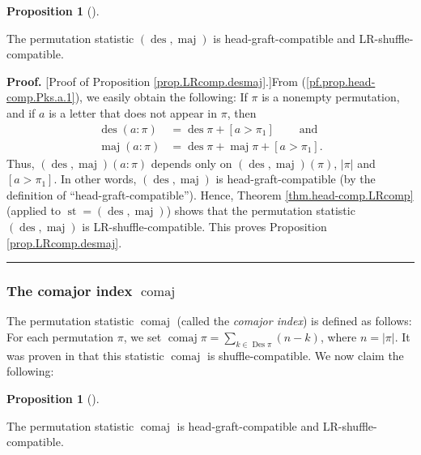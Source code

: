 \documentclass[numbers=enddot,12pt,final,onecolumn,notitlepage]{scrartcl}%
\theoremstyle{definition}
\newtheorem{prop}[theo]{Proposition}
\newenvironment{proposition}[1][]
{\begin{prop}[#1]\begin{leftbar}}
{\end{leftbar}\end{prop}}
\newenvironment{proof}[1][Proof]{\noindent\textbf{#1.} }{\ \rule{0.5em}{0.5em}}
\let\sumnonlimits\sum
\renewcommand{\sum}{\sumnonlimits\limits}
\begin{document}
\begin{proposition}
\label{prop.LRcomp.desmaj}The permutation statistic $\left(
\operatorname{des},\operatorname*{maj}\right)  $ is head-graft-compatible and LR-shuffle-compatible.
\end{proposition}

\begin{proof}
[Proof of Proposition \ref{prop.LRcomp.desmaj}.]From
(\ref{pf.prop.head-comp.Pks.a.1}), we easily obtain the following: If $\pi$ is
a nonempty permutation, and if $a$ is a letter that does not appear in $\pi$,
then%
\begin{align*}
\operatorname{des}\left(  a:\pi\right)
&  =\operatorname{des}\pi+\left[ a>\pi_{1}\right]
\ \ \ \ \ \ \ \ \ \ \text{and}\\
\operatorname{maj}\left(  a:\pi\right)
&  =\operatorname{des} \pi + \operatorname{maj}\pi +\left[  a>\pi_{1}\right]  .
\end{align*}
Thus, $\left(  \operatorname{des},\operatorname*{maj}\right)  \left(
a:\pi\right)  $ depends only on $\left(  \operatorname{des}
,\operatorname*{maj}\right)  \left(  \pi\right)  $, $\left\vert \pi\right\vert
$ and $\left[  a>\pi_{1}\right]  $. In other words, $\left(
\operatorname{des},\operatorname*{maj}\right)  $ is head-graft-compatible (by
the definition of \textquotedblleft head-graft-compatible\textquotedblright).
Hence, Theorem \ref{thm.head-comp.LRcomp} (applied to $\operatorname{st}
=\left(  \operatorname{des},\operatorname*{maj}\right)  $) shows that the
permutation statistic $\left(  \operatorname{des},\operatorname*{maj}\right)
$ is LR-shuffle-compatible. This proves Proposition \ref{prop.LRcomp.desmaj}.
\end{proof}

\subsubsection{The comajor index $\operatorname*{comaj}$}

The permutation statistic $\operatorname*{comaj}$ (called the \textit{comajor
index}) is defined as follows: For each permutation $\pi$, we set
$\operatorname*{comaj}\pi=\sum_{k\in\operatorname{Des}\pi}\left(  n-k\right)
$, where $n=\left\vert \pi\right\vert $. It was proven in \cite[\S 3.2]{part1}
that this statistic $\operatorname*{comaj}$ is shuffle-compatible. We now
claim the following:

\begin{proposition}
\label{prop.LRcomp.comaj}The permutation statistic $\operatorname*{comaj}$ is
head-graft-compatible and LR-shuffle-compatible.
\end{proposition}
\end{document}
